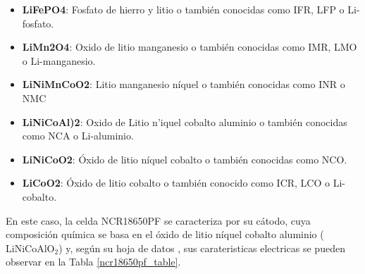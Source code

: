\documentclass[10pt,a4paper]{article}
\begin{document}
\begin{itemize}
    \item \textbf{LiFePO4}: Fosfato de hierro y litio o tambi\'en conocidas como
        IFR, LFP o Li-fosfato.
    \item \textbf{LiMn2O4}: Oxido de litio manganesio o tambi\'en conocidas como
        IMR, LMO o Li-manganesio.
    \item \textbf{LiNiMnCoO2}: Litio manganesio n\'iquel o tambi\'en conocidas como
        INR o NMC
    \item \textbf{LiNiCoAl)2}: Oxido de Litio n'iquel cobalto aluminio o
        tambi\'en conocidas como NCA o Li-aluminio.
    \item \textbf{LiNiCoO2}: \'Oxido de litio n\'iquel cobalto o tambi\'en
        conocidas como NCO.
    \item \textbf{LiCoO2}: \'Oxido de litio cobalto o tambi\'en conocido como
        ICR, LCO o Li-cobalto.
\end{itemize}

En este caso, la celda NCR18650PF se caracteriza por su cátodo, cuya composición 
química se basa en el óxido de litio níquel cobalto aluminio 
($\mathrm{LiNiCoAlO_2}$) y, según su hoja de datos \cite{18650pf}, sus 
carateristicas electricas se pueden observar en la Tabla \ref{ncr18650pf_table}.
\end{document}

